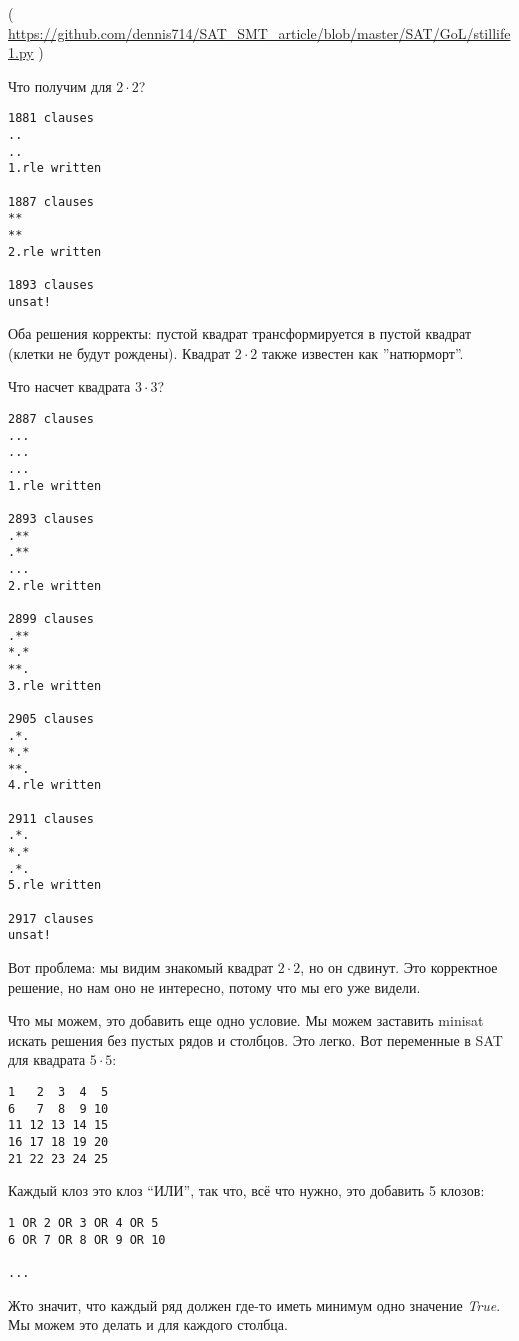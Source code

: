 

( \url{https://github.com/dennis714/SAT_SMT_article/blob/master/SAT/GoL/stillife1.py} )

Что получим для $2 \cdot 2$?

\begin{lstlisting}
1881 clauses
..
..
1.rle written

1887 clauses
**
**
2.rle written

1893 clauses
unsat!
\end{lstlisting}

Оба решения корректы: пустой квадрат трансформируется в пустой квадрат (клетки не будут рождены).
Квадрат $2 \cdot 2$ также известен как ''натюрморт''.

Что насчет квадрата $3 \cdot 3$?

\begin{lstlisting}
2887 clauses
...
...
...
1.rle written

2893 clauses
.**
.**
...
2.rle written

2899 clauses
.**
*.*
**.
3.rle written

2905 clauses
.*.
*.*
**.
4.rle written

2911 clauses
.*.
*.*
.*.
5.rle written

2917 clauses
unsat!
\end{lstlisting}

Вот проблема: мы видим знакомый квадрат $2 \cdot 2$, но он сдвинут.
Это корректное решение, но нам оно не интересно, потому что мы его уже видели.

Что мы можем, это добавить еще одно условие. Мы можем заставить minisat искать решения без пустых рядов и столбцов.
Это легко.
Вот переменные в SAT для квадрата $5 \cdot 5$:

\begin{lstlisting}
1   2  3  4  5
6   7  8  9 10
11 12 13 14 15
16 17 18 19 20
21 22 23 24 25
\end{lstlisting}

Каждый клоз это клоз ``ИЛИ'', так что, всё что нужно, это добавить 5 клозов:

\begin{lstlisting}
1 OR 2 OR 3 OR 4 OR 5
6 OR 7 OR 8 OR 9 OR 10

...

\end{lstlisting}

Жто значит, что каждый ряд должен где-то иметь минимум одно значение \textit{True}.
Мы можем это делать и для каждого столбца.

